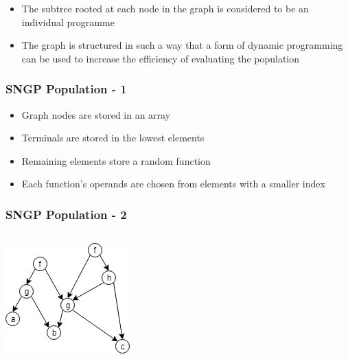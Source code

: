 \documentclass{beamer}
\begin{document}
\begin{frame}
\begin{frame}
\begin{itemize}
				\pause
				
				\item The subtree rooted at each node in the graph is considered to be an individual programme
				
				\pause
				
				\item The graph is structured in such a way that a form of dynamic programming can be used to increase the efficiency of evaluating the population
			\end{itemize}
			
		\end{frame}
	
		\begin{frame}
		
			\frametitle{SNGP Population - 1}
			
					
			\begin{itemize}
				\pause
				\item Graph nodes are stored in an array
				\pause
				\item Terminals are stored in the lowest elements
				\pause
				\item Remaining elements store a random function
				\pause
				\item Each function's operands are chosen from elements with a smaller index
			\end{itemize}
				
		
		\end{frame}
	
		\begin{frame}
			\frametitle{SNGP Population - 2}
			
			\begin{columns}
				
				\begin{column}{0.4\textwidth}
					
					\includegraphics[scale=0.7]{resources/9_sngp_graph_no_array}
					

\end{column}
\end{columns}
\end{frame}
\end{frame}
\end{document}
